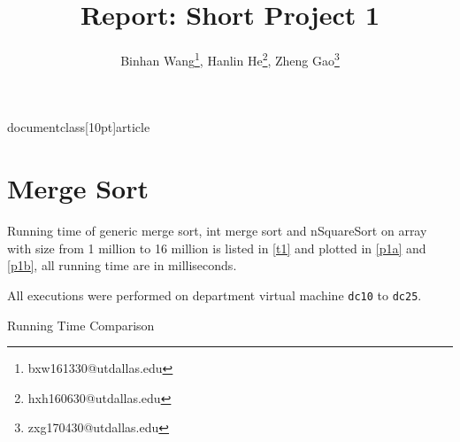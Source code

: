 documentclass[10pt]{article}

\usepackage[l2tabu, orthodox]{nag}
\usepackage{tabu}
\usepackage[onehalfspacing]{setspace}
\usepackage{amsmath}
\usepackage{amsthm}
\usepackage{amsfonts}
\usepackage{float}

\usepackage{pgfplots}
\usepackage{pgfplotstable}
\usepackage{booktabs}
\usepackage{array}
\usepackage{colortbl}

\usepackage{subcaption}

\usepackage{hyperref}

\usepackage{cleveref}

\title{\vspace*{-2em}Report: Short Project 1}
\author{Binhan Wang\footnote{bxw161330@utdallas.edu}, Hanlin He\footnote{hxh160630@utdallas.edu},
Zheng Gao\footnote{zxg170430@utdallas.edu}}


\maketitle

\section{Merge Sort}

Running time of generic merge sort, int merge sort and nSquareSort on array
with size from 1 million to 16 million is listed in \cref{t1} and plotted in \cref{p1a} and \cref{p1b}, all running time
are in milliseconds.

All executions were performed on department virtual machine \texttt{dc10} to \texttt{dc25}.
\begin{table}[H]
\centering
\caption{Running Time Comparison}\label{t1}
\end{table}



